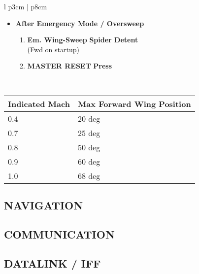 \documentclass[8pt,usenames,dvipsnames,twoside]{article}
\begin{document}
\begin{center}
\begin{longtable}{l p{3cm} | p{8cm}}
\begin{minipage}[t]{\linewidth}
					\vspace{-7pt}
					\begin{itemize}
						\item \textbf{After Emergency Mode / Oversweep}
						\begin{enumerate}[label=(\alph*)]
							\item \textbf{Em. Wing-Sweep} \dotfill \textbf{Spider Detent} \\
							\hfill (Fwd on startup)
							\item \textbf{MASTER RESET} \dotfill \textbf{Press}
						\end{enumerate}
					\end{itemize}
				\end{minipage} \\
				\bottomrule
			\end{longtable}
		\end{center}
		\begin{center}
			\begin{tabular}{p{3cm} | p{5cm}}
				\toprule
				\textbf{Indicated Mach} & \textbf{Max Forward Wing Position} \\
				\midrule
				0.4 & 20 deg \\
				\midrule
				0.7 & 25 deg \\
				\midrule
				0.8 & 50 deg \\
				\midrule
				0.9 & 60 deg \\
				\midrule
				1.0 & 68 deg \\
				\bottomrule
			\end{tabular}
		\end{center}
	
		\subsection{NAVIGATION}
		\subsection{COMMUNICATION}
		\subsection{DATALINK / IFF}
		
		\clearpage
		
\end{document}
